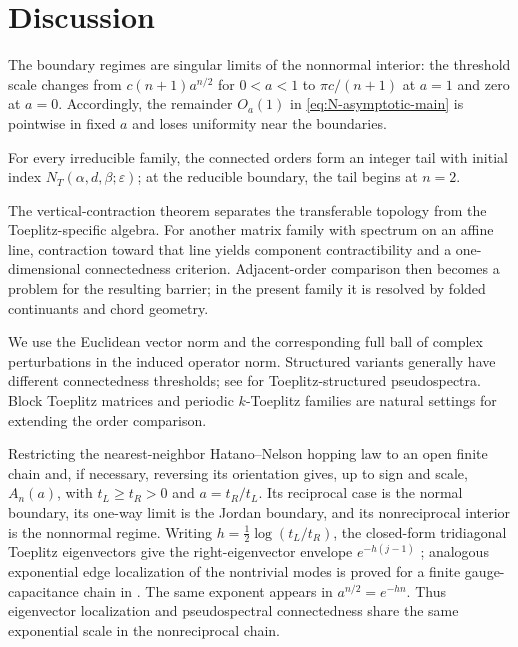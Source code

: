 \documentclass[11pt,a4paper]{article}
\numberwithin{equation}{section}
\begin{document}
\section{Discussion}\label{sec:discussion}

The boundary regimes are singular limits of the nonnormal interior: the
threshold scale changes from \(c(n+1)a^{n/2}\) for \(0<a<1\) to
\(\pi c/(n+1)\) at \(a=1\) and zero at \(a=0\).  Accordingly, the remainder
\(O_a(1)\) in \eqref{eq:N-asymptotic-main} is pointwise in fixed \(a\) and
loses uniformity near the boundaries.

For every irreducible family, the connected orders form an integer tail with
initial index \(N_T(\alpha,d,\beta;\varepsilon)\); at the reducible boundary,
the tail begins at \(n=2\).

The vertical-contraction theorem separates the transferable topology from
the Toeplitz-specific algebra.  For another matrix family with spectrum on an
affine line, contraction toward that line yields component contractibility
and a one-dimensional connectedness criterion.  Adjacent-order comparison
then becomes a problem for the resulting barrier; in the present family it is
resolved by folded continuants and chord geometry.

We use the Euclidean vector norm and the corresponding full ball of complex
perturbations in the induced operator norm.  Structured variants generally
have different connectedness thresholds; see
\cite{ButtaGuglielmiNoschese2012} for Toeplitz-structured pseudospectra.
Block Toeplitz matrices and periodic \(k\)-Toeplitz families are natural
settings for extending the order comparison.

Restricting the nearest-neighbor Hatano--Nelson hopping law
\cite{HatanoNelson1996,HatanoNelson1997} to an open finite chain and, if
necessary, reversing its orientation gives, up to sign and scale,
\(A_n(a)\), with \(t_L\geq t_R>0\) and \(a=t_R/t_L\).  Its reciprocal
case is the normal boundary, its one-way limit is the Jordan boundary, and
its nonreciprocal interior is the nonnormal regime.  Writing
\(h=\tfrac12\log(t_L/t_R)\), the closed-form tridiagonal Toeplitz
eigenvectors give the right-eigenvector envelope \(e^{-h(j-1)}\)
\cite{NoschesePasquiniReichel2013}; analogous exponential edge localization
of the nontrivial modes is proved for a finite gauge-capacitance chain in
\cite{AmmariEtAl2024}.
The same exponent appears in \(a^{n/2}=e^{-hn}\).  Thus eigenvector
localization and pseudospectral connectedness share the same exponential
scale in the nonreciprocal chain.
\end{document}
